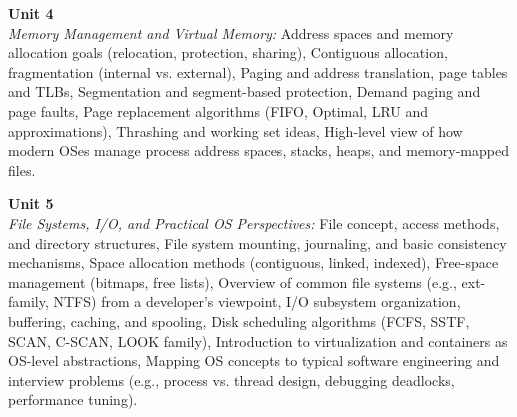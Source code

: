 \vspace{0.3cm}

\noindent\textbf{Unit 4} \\
\textit{Memory Management and Virtual Memory:} Address spaces and memory allocation goals (relocation, protection, sharing), Contiguous allocation, fragmentation (internal vs. external), Paging and address translation, page tables and TLBs, Segmentation and segment-based protection, Demand paging and page faults, Page replacement algorithms (FIFO, Optimal, LRU and approximations), Thrashing and working set ideas, High-level view of how modern OSes manage process address spaces, stacks, heaps, and memory-mapped files.

\vspace{0.3cm}

\noindent\textbf{Unit 5} \\
\textit{File Systems, I/O, and Practical OS Perspectives:} File concept, access methods, and directory structures, File system mounting, journaling, and basic consistency mechanisms, Space allocation methods (contiguous, linked, indexed), Free-space management (bitmaps, free lists), Overview of common file systems (e.g., ext-family, NTFS) from a developer’s viewpoint, I/O subsystem organization, buffering, caching, and spooling, Disk scheduling algorithms (FCFS, SSTF, SCAN, C-SCAN, LOOK family), Introduction to virtualization and containers as OS-level abstractions, Mapping OS concepts to typical software engineering and interview problems (e.g., process vs. thread design, debugging deadlocks, performance tuning).

\newpage
{}
